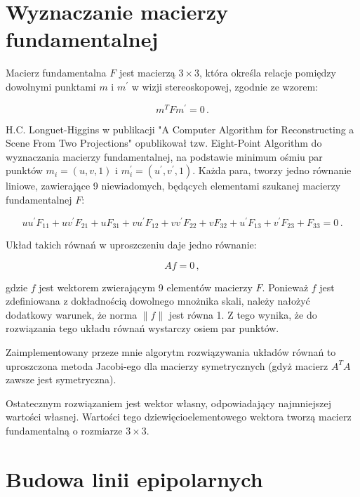 \section{Wyznaczanie macierzy fundamentalnej}

Macierz fundamentalna $F$ jest macierzą $3 \times 3$, która określa relacje
pomiędzy dowolnymi punktami $m$ i $m^\prime$ w wizji stereoskopowej, zgodnie ze
wzorem: 

\begin{equation}
  m^TFm^\prime = 0\,.
\end{equation}

H.C. Longuet-Higgins w publikacji "A Computer Algorithm for Reconstructing a
Scene From Two Projections" \cite{eight_point} opublikował tzw.  Eight-Point
Algorithm do wyznaczania macierzy fundamentalnej, na podstawie minimum ośmiu
par punktów $m_i=(u,v,1)$ i $m_i^\prime=(u^\prime,v^\prime,1)$.  Każda para,
tworzy jedno równanie liniowe, zawierające 9 niewiadomych, będących elementami
szukanej macierzy fundamentalnej $F$: 

\begin{equation} uu^\prime F_{11} + uv^\prime F_{21} + uF_{31} + vu^\prime
  F_{12} + vv^\prime F_{22} + vF_{32} + u^\prime F_{13} + v^\prime F_{23} +
  F_{33} = 0\,.  \end{equation}

Układ takich równań w uproszczeniu daje jedno równanie: 

\begin{equation} Af=0\,, \end{equation}

gdzie $f$ jest wektorem zwierającym 9 elementów macierzy $F$. Ponieważ $f$ jest
zdefiniowana z dokładnością dowolnego mnożnika skali, należy nałożyć dodatkowy
warunek, że norma $\|f\|$ jest równa 1. Z tego wynika, że do rozwiązania tego
układu równań wystarczy osiem par punktów.

Zaimplementowany przeze mnie algorytm rozwiązywania układów równań to
uproszczona metoda Jacobi-ego dla macierzy symetrycznych (gdyż macierz $A^TA$
zawsze jest symetryczna).

Ostatecznym rozwiązaniem jest wektor własny, odpowiadający najmniejszej
wartości własnej.  Wartości tego dziewięcioelementowego wektora tworzą macierz
fundamentalną o rozmiarze $3 \times 3$.

\section{Budowa linii epipolarnych}

